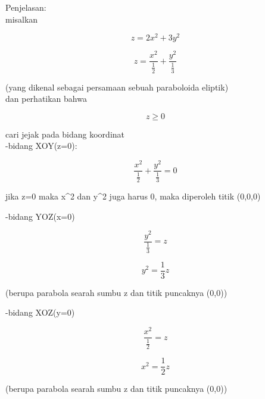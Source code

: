 \documentclass[a4paper,10pt]{article}
\begin{document}
\begin{eulernotebook}
\begin{eulercomment}
\begin{eulercomment}
\begin{eulercomment}
Penjelasan:\\
misalkan\\
\end{eulercomment}
\begin{eulerformula}
\[
z=2x^2+3y^2
\]
\end{eulerformula}
\begin{eulerformula}
\[
z=\frac{x^2}{\frac{1}{2}}+\frac{y^2}{\frac{1}{3}}
\]
\end{eulerformula}
\begin{eulercomment}
(yang dikenal sebagai persamaan sebuah paraboloida eliptik)\\
dan perhatikan bahwa\\
\end{eulercomment}
\begin{eulerformula}
\[
z\ge0
\]
\end{eulerformula}
\begin{eulercomment}
cari jejak pada bidang koordinat\\
-bidang XOY(z=0):\\
\end{eulercomment}
\begin{eulerformula}
\[
\frac{x^2}{\frac{1}{2}}+\frac{y^2}{\frac{1}{3}}=0
\]
\end{eulerformula}
\begin{eulercomment}
jika z=0 maka x\textasciicircum{}2 dan y\textasciicircum{}2 juga harus 0, maka diperoleh titik (0,0,0)

-bidang YOZ(x=0)\\
\end{eulercomment}
\begin{eulerformula}
\[
\frac{y^2}{\frac{1}{3}}=z
\]
\end{eulerformula}
\begin{eulerformula}
\[
y^2={\frac{1}{3}}z
\]
\end{eulerformula}
\begin{eulercomment}
(berupa parabola searah sumbu z dan titik puncaknya (0,0))

-bidang XOZ(y=0)\\
\end{eulercomment}
\begin{eulerformula}
\[
\frac{x^2}{\frac{1}{2}}=z
\]
\end{eulerformula}
\begin{eulerformula}
\[
x^2={\frac{1}{2}}z
\]
\end{eulerformula}
\begin{eulercomment}
(berupa parabola searah sumbu z dan titik puncaknya (0,0))


\end{eulercomment}
\end{eulercomment}
\end{eulercomment}
\end{eulernotebook}
\end{document}
